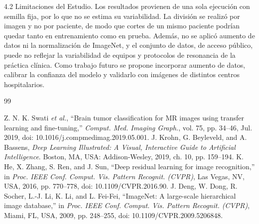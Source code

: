 \documentclass[letterpaper, 10 pt, conference]{ieeeconf}  %
\begin{document}
4.2 Limitaciones del Estudio.
Los resultados provienen de una sola ejecución con semilla fija, por lo que no se estima su variabilidad. La división se realizó por imagen y no por paciente, de modo que cortes de un mismo paciente podrían quedar tanto en entrenamiento como en prueba. Además, no se aplicó aumento de datos ni la normalización de ImageNet, y el conjunto de datos, de acceso público, puede no reflejar la variabilidad de equipos y protocolos de resonancia de la práctica clínica. Como trabajo futuro se propone incorporar aumento de datos, calibrar la confianza del modelo y validarlo con imágenes de distintos centros hospitalarios.


\begin{thebibliography}{99}

 Z. N. K. Swati \textit{et al.}, ``Brain tumor classification for MR images using transfer learning and fine-tuning,'' \textit{Comput. Med. Imaging Graph.}, vol. 75, pp. 34--46, Jul. 2019, doi: 10.1016/j.compmedimag.2019.05.001.
 J. Krohn, G. Beyleveld, and A. Bassens, \textit{Deep Learning Illustrated: A Visual, Interactive Guide to Artificial Intelligence}. Boston, MA, USA: Addison-Wesley, 2019, ch. 10, pp. 159--194.
 K. He, X. Zhang, S. Ren, and J. Sun, ``Deep residual learning for image recognition,'' in \textit{Proc. IEEE Conf. Comput. Vis. Pattern Recognit. (CVPR)}, Las Vegas, NV, USA, 2016, pp. 770--778, doi: 10.1109/CVPR.2016.90.
 J. Deng, W. Dong, R. Socher, L.-J. Li, K. Li, and L. Fei-Fei, ``ImageNet: A large-scale hierarchical image database,'' in \textit{Proc. IEEE Conf. Comput. Vis. Pattern Recognit. (CVPR)}, Miami, FL, USA, 2009, pp. 248--255, doi: 10.1109/CVPR.2009.5206848.

\end{thebibliography}
\end{document}
